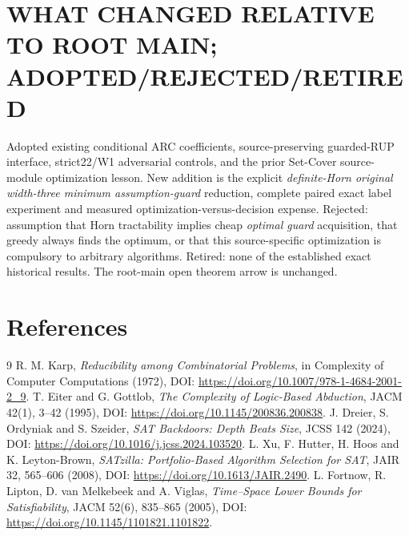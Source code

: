 \documentclass[11pt]{article}
\begin{document}
\section{WHAT CHANGED RELATIVE TO ROOT MAIN; ADOPTED/REJECTED/RETIRED}
Adopted existing conditional ARC coefficients, source-preserving guarded-RUP interface, strict22/W1 adversarial controls, and the prior Set-Cover source-module optimization lesson. New addition is the explicit \emph{definite-Horn original width-three minimum assumption-guard} reduction, complete paired exact label experiment and measured optimization-versus-decision expense. Rejected: assumption that Horn tractability implies cheap \emph{optimal guard} acquisition, that greedy always finds the optimum, or that this source-specific optimization is compulsory to arbitrary algorithms. Retired: none of the established exact historical results. The root-main open theorem arrow is unchanged.

\section{References}
\begin{thebibliography}{9}
 R. M. Karp, \emph{Reducibility among Combinatorial Problems}, in Complexity of Computer Computations (1972), DOI: \url{https://doi.org/10.1007/978-1-4684-2001-2_9}.
 T. Eiter and G. Gottlob, \emph{The Complexity of Logic-Based Abduction}, JACM 42(1), 3--42 (1995), DOI: \url{https://doi.org/10.1145/200836.200838}.
 J. Dreier, S. Ordyniak and S. Szeider, \emph{SAT Backdoors: Depth Beats Size}, JCSS 142 (2024), DOI: \url{https://doi.org/10.1016/j.jcss.2024.103520}.
 L. Xu, F. Hutter, H. Hoos and K. Leyton-Brown, \emph{SATzilla: Portfolio-Based Algorithm Selection for SAT}, JAIR 32, 565--606 (2008), DOI: \url{https://doi.org/10.1613/JAIR.2490}.
 L. Fortnow, R. Lipton, D. van Melkebeek and A. Viglas, \emph{Time--Space Lower Bounds for Satisfiability}, JACM 52(6), 835--865 (2005), DOI: \url{https://doi.org/10.1145/1101821.1101822}.
\end{thebibliography}
\end{document}
